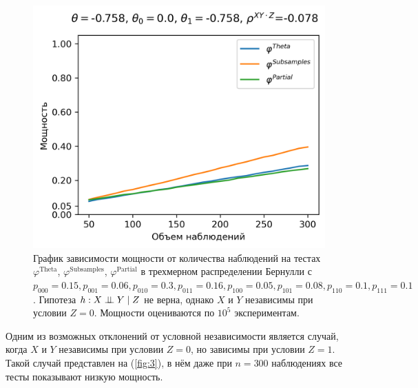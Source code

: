 \begin{figure}[H]
    \centering
    \includegraphics[scale=0.55]{images/graph3.png}
    \caption{График зависимости мощности от количества наблюдений
    на тестах $\varphi^{\text{Theta}}$, $\varphi^{\text{Subsamples}}$, $\varphi^{\text{Partial}}$
    в трехмерном распределении Бернулли с $p_{000}=0.15, p_{001}=0.06, 
    p_{010}=0.3, p_{011}=0.16,
    p_{100}=0.05, p_{101}=0.08, p_{110}=0.1, p_{111}=0.1$. 
    Гипотеза $h: X \perp\!\!\!\perp Y \mid Z$ не верна, однако $X$ и $Y$ независимы
    при условии $Z=0$. 
    Мощности оцениваются по $10^5$ экспериментам.}\label{fig:3}
\end{figure}

Одним из возможных отклонений от условной независимости является случай,
когда $X$ и $Y$ независимы при условии $Z=0$, но зависимы при условии $Z=1$.
Такой случай представлен на (\autoref{fig:3}), в нём даже при $n=300$ наблюдениях все тесты показывают
низкую мощность.

